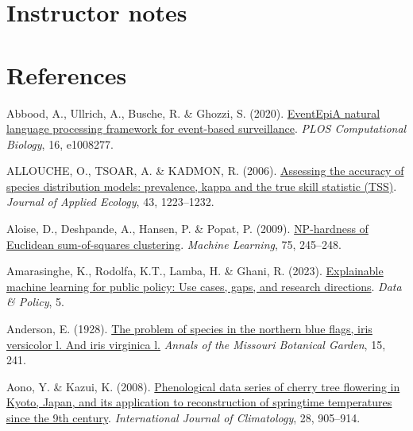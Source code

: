\documentclass[
  letterpaper,
]{scrbook}
\newlength{\cslhangindent}
\newenvironment{CSLReferences}[2] %
 {\begin{list}{}{%
  \setlength{\itemindent}{0pt}
  \setlength{\leftmargin}{0pt}
  \setlength{\parsep}{0pt}
  \ifodd #1
   \setlength{\leftmargin}{\cslhangindent}
   \setlength{\itemindent}{-1\cslhangindent}
  \fi
  \setlength{\itemsep}{#2\baselineskip}}}
 {\end{list}}
\begin{document}
\chapter{Instructor notes}\label{sec-instructor}

\label{3ade8a4a-fb1d-4a6c-8409-ac45482d5fc9}

\chapter*{References}\label{bibliography}

\label{refs}
\begin{CSLReferences}{1}{0}
Abbood, A., Ullrich, A., Busche, R. \& Ghozzi, S. (2020).
\href{https://doi.org/10.1371/journal.pcbi.1008277}{EventEpi{\textemdash}A
natural language processing framework for event-based surveillance}.
\emph{PLOS Computational Biology}, 16, e1008277.

ALLOUCHE, O., TSOAR, A. \& KADMON, R. (2006).
\href{https://doi.org/10.1111/j.1365-2664.2006.01214.x}{Assessing the
accuracy of species distribution models: prevalence, kappa and the true
skill statistic (TSS)}. \emph{Journal of Applied Ecology}, 43,
1223--1232.

Aloise, D., Deshpande, A., Hansen, P. \& Popat, P. (2009).
\href{https://doi.org/10.1007/s10994-009-5103-0}{NP-hardness of
Euclidean sum-of-squares clustering}. \emph{Machine Learning}, 75,
245--248.

Amarasinghe, K., Rodolfa, K.T., Lamba, H. \& Ghani, R. (2023).
\href{https://doi.org/10.1017/dap.2023.2}{Explainable machine learning
for public policy: Use cases, gaps, and research directions}. \emph{Data
\& Policy}, 5.

Anderson, E. (1928). \href{https://doi.org/10.2307/2394087}{The problem
of species in the northern blue flags, iris versicolor l. And iris
virginica l.} \emph{Annals of the Missouri Botanical Garden}, 15, 241.

Aono, Y. \& Kazui, K. (2008).
\href{https://doi.org/10.1002/joc.1594}{Phenological data series of
cherry tree flowering in Kyoto, Japan, and its application to
reconstruction of springtime temperatures since the 9th century}.
\emph{International Journal of Climatology}, 28, 905--914.


\end{CSLReferences}
\end{document}
